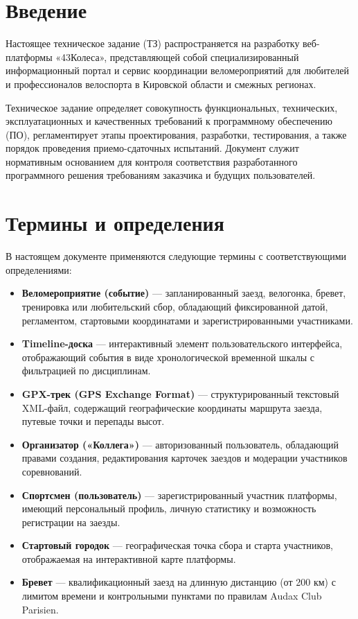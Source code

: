 \documentclass[a4paper,12pt]{article}
\begin{document}
\section*{Введение}

Настоящее техническое задание (ТЗ) распространяется на разработку веб-платформы «43Колеса», представляющей собой специализированный информационный портал и сервис координации веломероприятий для любителей и профессионалов велоспорта в Кировской области и смежных регионах.

Техническое задание определяет совокупность функциональных, технических, эксплуатационных и качественных требований к программному обеспечению (ПО), регламентирует этапы проектирования, разработки, тестирования, а также порядок проведения приемо-сдаточных испытаний. Документ служит нормативным основанием для контроля соответствия разработанного программного решения требованиям заказчика и будущих пользователей.

\section{Термины и определения}

В настоящем документе применяются следующие термины с соответствующими определениями:
\begin{itemize}
	\item \textbf{Веломероприятие (событие)} — запланированный заезд, велогонка, бревет, тренировка или любительский сбор, обладающий фиксированной датой, регламентом, стартовыми координатами и зарегистрированными участниками.
	\item \textbf{Timeline-доска} — интерактивный элемент пользовательского интерфейса, отображающий события в виде хронологической временной шкалы с фильтрацией по дисциплинам.
	\item \textbf{GPX-трек (GPS Exchange Format)} — структурированный текстовый XML-файл, содержащий географические координаты маршрута заезда, путевые точки и перепады высот.
	\item \textbf{Организатор («Коллега»)} — авторизованный пользователь, обладающий правами создания, редактирования карточек заездов и модерации участников соревнований.
	\item \textbf{Спортсмен (пользователь)} — зарегистрированный участник платформы, имеющий персональный профиль, личную статистику и возможность регистрации на заезды.
	\item \textbf{Стартовый городок} — географическая точка сбора и старта участников, отображаемая на интерактивной карте платформы.
	\item \textbf{Бревет} — квалификационный заезд на длинную дистанцию (от 200 км) с лимитом времени и контрольными пунктами по правилам Audax Club Parisien.
\end{itemize}
\end{document}
